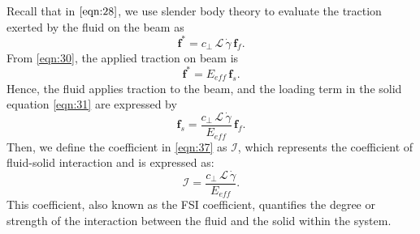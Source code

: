 \documentclass[a4paper,12pt]{article}
\begin{document}
Recall that in $\eqref{eqn:28}$, we use slender body theory to evaluate the traction exerted by the fluid on the beam as
\begin{equation}
	\label{eqn:102}
	\mathbf{f}^*=c_\perp\,\mathcal{L}\,\dot{\gamma}\,\mathbf{f}_{f}.
\end{equation}
From \eqref{eqn:30}, the applied traction on beam is 
\begin{equation}
	\label{eqn:103}
	\mathbf{f}^*=E_{eff}\,\mathbf{f}_{s}.
\end{equation}
Hence, the fluid applies traction to the beam, and the loading term in the solid equation \eqref{eqn:31} are expressed by
\begin{equation}
	\label{eqn:37}
	\textbf{f}_{s}=\frac{c_\perp\,\mathcal{L}\,\dot{\gamma}}{E_{eff}}\,\textbf{f}_{f}.
\end{equation}
Then, we define the coefficient in \eqref{eqn:37} as $\mathcal{I}$, which represents the coefficient of fluid-solid interaction and is expressed as:
\begin{equation}
	\label{eqn:38}
	\mathcal{I}=\frac{c_\perp\,\mathcal{L}\,\dot{\gamma}}{E_{eff}}.
\end{equation}
This coefficient, also known as the FSI coefficient, quantifies the degree or strength of the interaction between the fluid and the solid within the system.
\end{document}
